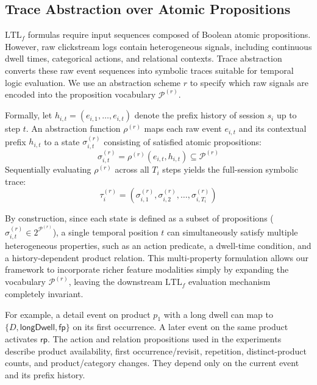 \documentclass[sigconf,anonymous,nonacm]{acmart}
\newif\ifrevisions
\newcommand{\rev}[1]{\ifrevisions\textcolor{red}{#1}\else#1\fi}
\begin{document}
\subsection{Trace Abstraction over Atomic Propositions}
\label{sec:trace_abstraction}

$\text{LTL}_f$ formulas require input sequences composed of Boolean atomic propositions. However, raw clickstream logs contain heterogeneous signals, including continuous dwell times, categorical actions, and relational contexts. Trace abstraction converts these raw event sequences into symbolic traces suitable for temporal logic evaluation. We use an abstraction scheme $r$ to specify which raw signals are encoded into the proposition vocabulary $\mathcal{P}^{(r)}$.

Formally, let $h_{i,t} = (e_{i,1},\dots,e_{i,t})$ denote the prefix history of session $s_i$ up to step $t$. An abstraction function $\rho^{(r)}$ maps each raw event $e_{i,t}$ and its contextual prefix $h_{i,t}$ to a state $\sigma_{i,t}^{(r)}$ consisting of satisfied atomic propositions:
\begin{equation}
    \sigma_{i,t}^{(r)} = \rho^{(r)}(e_{i,t}, h_{i,t}) \subseteq \mathcal{P}^{(r)}
\end{equation}
Sequentially evaluating $\rho^{(r)}$ across all $T_i$ steps yields the full-session symbolic trace:
\begin{equation}
    \tau_i^{(r)} = (\sigma_{i,1}^{(r)}, \sigma_{i,2}^{(r)}, \dots, \sigma_{i,T_i}^{(r)})
\end{equation}

By construction, since each state is defined as a subset of propositions ($\sigma_{i,t}^{(r)} \in 2^{\mathcal{P}^{(r)}}$), a single temporal position $t$ can simultaneously satisfy multiple heterogeneous properties, such as an action predicate, a dwell-time condition, and a history-dependent product relation. This multi-property formulation allows our framework to incorporate richer feature modalities simply by expanding the vocabulary $\mathcal{P}^{(r)}$, leaving the downstream $\text{LTL}_f$ evaluation mechanism completely invariant.

\rev{For example, a detail event on product $p_1$ with a long dwell can map to $\{D,\mathsf{longDwell},\mathsf{fp}\}$ on its first occurrence. A later event on the same product activates $\mathsf{rp}$. The action and relation propositions used in the experiments describe product availability, first occurrence/revisit, repetition, distinct-product counts, and product/category changes. They depend only on the current event and its prefix history.}
\end{document}
